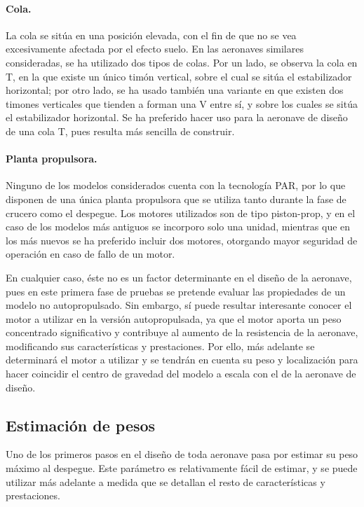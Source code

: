 \paragraph{Cola.} La cola se sitúa en una posición elevada, con el fin de que no se vea excesivamente afectada por el efecto suelo. En las aeronaves similares consideradas, se ha utilizado dos tipos de colas. Por un lado, se observa la cola en T, en la que existe un único timón vertical, sobre el cual se sitúa el estabilizador horizontal; por otro lado, se ha usado también una variante en que existen dos timones verticales que tienden a forman una V entre sí, y sobre los cuales se sitúa el estabilizador horizontal. Se ha preferido hacer uso para la aeronave de diseño de una cola T, pues resulta más sencilla de construir.

\paragraph{Planta propulsora.} Ninguno de los modelos considerados cuenta con la tecnología PAR, por lo que disponen de una única planta propulsora que se utiliza tanto durante la fase de crucero como el despegue. Los motores utilizados son de tipo piston-prop, y en el caso de los modelos más antiguos se incorporo solo una unidad, mientras que en los más nuevos se ha preferido incluir dos motores, otorgando mayor seguridad de operación en caso de fallo de un motor.

En cualquier caso, éste no es un factor determinante en el diseño de la aeronave, pues en este primera fase de pruebas se pretende evaluar las propiedades de un modelo no autopropulsado. Sin embargo, sí puede resultar interesante conocer el motor a utilizar en la versión autopropulsada, ya que el motor aporta un peso concentrado significativo y contribuye al aumento de la resistencia de la aeronave, modificando sus características y prestaciones. Por ello, más adelante se determinará el motor a utilizar y se tendrán en cuenta su peso y localización para hacer coincidir el centro de gravedad del modelo a escala con el de la aeronave de diseño.


\subsection{Estimación de pesos}
\label{sec:design:weights}

Uno de los primeros pasos en el diseño de toda aeronave pasa por estimar su peso máximo al despegue. Este parámetro es relativamente fácil de estimar, y se puede utilizar más adelante a medida que se detallan el resto de características y prestaciones.

